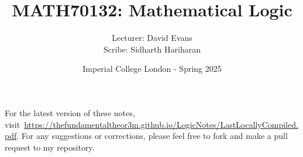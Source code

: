 \documentclass[a4paper, 12pt, openany, oneside]{book}
\title{\vspace{-2em}MATH70132: Mathematical Logic}
\author{Lecturer: David Evans \\ Scribe: Sidharth Hariharan}
\date{Imperial College London - Spring 2025}
\begin{document}
\setlength{\abovedisplayskip}{7.5pt}  %
\setlength{\belowdisplayskip}{7.5pt}  %
\setlength{\abovedisplayshortskip}{2pt}
\setlength{\belowdisplayshortskip}{2pt}

\maketitle
\thispagestyle{empty}

\tableofcontents
\thispagestyle{empty}

\newpage




% 
% 



\newpage

\thispagestyle{empty}

\printbibliography[title={References}, prenote=mybibnote]

For the latest version of these notes, visit~\url{https://thefundamentaltheor3m.github.io/LogicNotes/LastLocallyCompiled.pdf}. For any suggestions or corrections, please feel free to fork and make a pull request to my repository.
\end{document}
